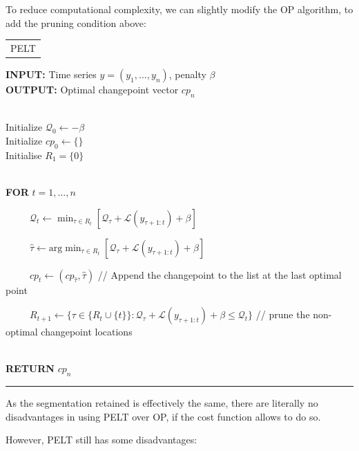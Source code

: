 \documentclass[
  letterpaper,
  DIV=11,
  numbers=noendperiod]{scrreprt}
\begin{document}
To reduce computational complexity, we can slightly modify the OP
algorithm, to add the pruning condition above:

\begin{longtable}[]{@{}l@{}}
\toprule\noalign{}
\endhead
\bottomrule\noalign{}
\endlastfoot
PELT \\
\end{longtable}

\textbf{INPUT:} Time series \(y = (y_1, ..., y_n)\), penalty \(\beta\)\\
\textbf{OUTPUT:} Optimal changepoint vector \(cp_n\)\\
\strut \\
Initialize \(\mathcal{Q}_0 \leftarrow -\beta\)\\
Initialize \(cp_0 \leftarrow \{\}\)\\
Initialise \(R_1 = \{0\}\)\\
\strut \\
\textbf{FOR} \(t = 1, \dots, n\)\\
\strut ~~~~~\(\mathcal{Q}_t \leftarrow \min_{\tau \in R_t} \left[ \mathcal{Q}_{\tau} + \mathcal{L}(y_{\tau + 1:t}) + \beta \right]\)\\
\strut ~~~~~\(\hat\tau \leftarrow \text{arg}\min_{\tau \in R_t} \left[ \mathcal{Q}_{\tau} + \mathcal{L}(y_{\tau + 1:t}) + \beta \right]\)\\
\strut ~~~~~\(cp_t \leftarrow (cp_{\hat\tau}, \hat\tau)\) // Append the
changepoint to the list at the last optimal point\\
\strut ~~~~~\(R_{t+1} \leftarrow \{\tau \in \{R_t \cup \{t\}\} : \mathcal{Q}_\tau + \mathcal{L}(y_{\tau + 1:t}) + \beta \leq \mathcal{Q}_t \}\)
// prune the non-optimal changepoint locations\\
\strut \\
\textbf{RETURN} \(cp_n\)

\begin{center}\rule{0.5\linewidth}{0.5pt}\end{center}

As the segmentation retained is effectively the same, there are
literally no disadvantages in using PELT over OP, if the cost function
allows to do so.

However, PELT still has some disadvantages:
\end{document}
